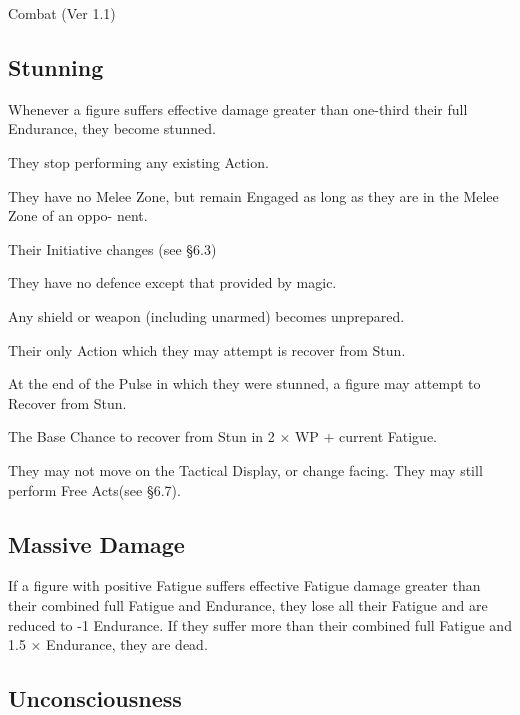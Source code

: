 \begin{Chapter}{Combat (Ver 1.1)}
\subsection{Stunning}

Whenever a figure suffers effective damage greater than one-third
their full Endurance, they become stunned.

\begin{Itemize}

\item They stop performing any existing Action.  

\item They have no Melee Zone, but remain Engaged as long as they are
  in the Melee Zone of an oppo- nent.

\item Their Initiative changes (see §6.3)  

\item They have no defence except that provided by magic.

\item Any shield or weapon (including unarmed) becomes unprepared.

\item Their only Action which they may attempt is recover from Stun.

\item At the end of the Pulse in which they were stunned, a figure may
  attempt to Recover from Stun.

\item The Base Chance to recover from Stun in 2 × WP + current
  Fatigue.

\item They may not move on the Tactical Display, or change facing.
  They may still perform Free Acts(see §6.7).

\end{Itemize}

\subsection{Massive Damage}

If a figure with positive Fatigue suffers effective Fatigue damage
greater than their combined full Fatigue and Endurance, they lose all
their Fatigue and are reduced to -1 Endurance.  If they suffer more
than their combined full Fatigue and 1.5 × Endurance, they are dead.

\subsection{Unconsciousness}


\end{Chapter}
